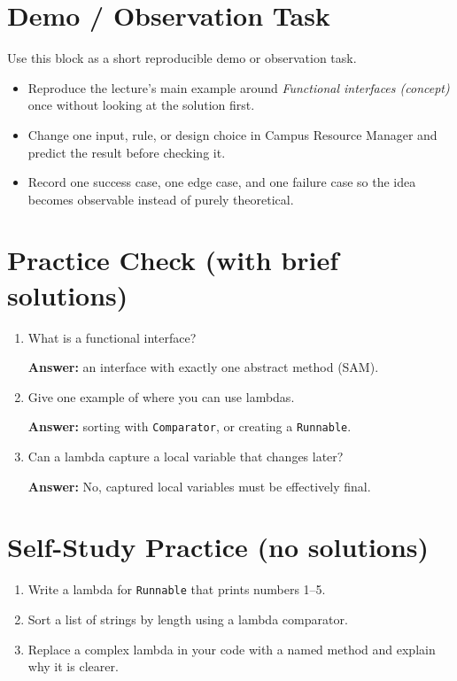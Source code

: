 \documentclass[11pt]{article}
\begin{document}
\section{Demo / Observation Task}
Use this block as a short reproducible demo or observation task.
\begin{itemize}
  \item Reproduce the lecture's main example around \textit{Functional interfaces (concept)} once without looking at the solution first.
  \item Change one input, rule, or design choice in Campus Resource Manager and predict the result before checking it.
  \item Record one success case, one edge case, and one failure case so the idea becomes observable instead of purely theoretical.
\end{itemize}
\notesources{\OOPSUnitIVSources}

\section{Practice Check (with brief solutions)}
\begin{enumerate}
  \item What is a functional interface?\par
  \textbf{Answer:} an interface with exactly one abstract method (SAM).

  \item Give one example of where you can use lambdas.\par
  \textbf{Answer:} sorting with \texttt{Comparator}, or creating a \texttt{Runnable}.

  \item Can a lambda capture a local variable that changes later?\par
  \textbf{Answer:} No, captured local variables must be effectively final.
\end{enumerate}

\section{Self-Study Practice (no solutions)}
\begin{enumerate}
  \item Write a lambda for \texttt{Runnable} that prints numbers 1--5.
  \item Sort a list of strings by length using a lambda comparator.
  \item Replace a complex lambda in your code with a named method and explain why it is clearer.
\end{enumerate}
\end{document}
